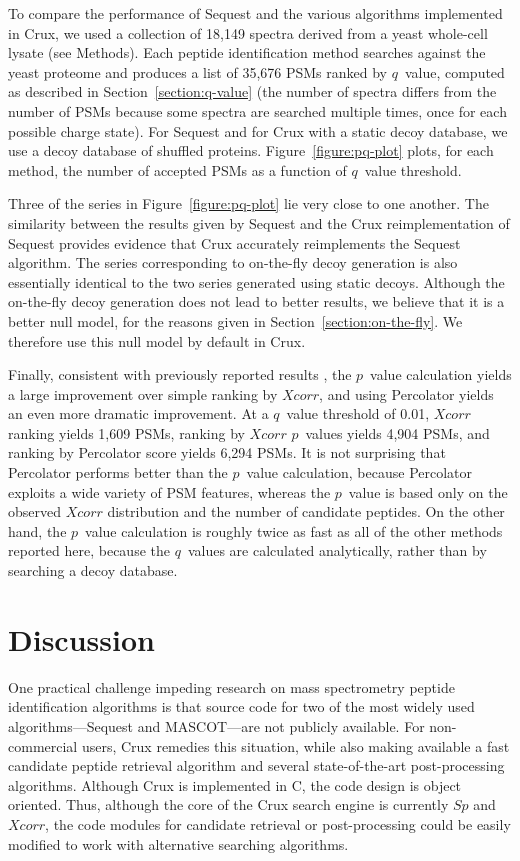\documentclass[12pt]{article}
\begin{document}
To compare the performance of {\sc Sequest} and the various algorithms
implemented in Crux, we used a collection of 18,149 spectra derived
from a yeast whole-cell lysate (see Methods).  Each peptide
identification method searches against the yeast proteome and produces
a list of 35,676 PSMs ranked by $q$~value, computed as described in
Section~\ref{section:q-value} (the number of spectra differs from the number
of PSMs because some spectra are searched multiple times, once for each
possible charge state).  For {\sc Sequest} and for Crux with a static
decoy database, we use a decoy database of shuffled proteins.
Figure~\ref{figure:pq-plot} plots, for each method, the number of
accepted PSMs as a function of $q$~value threshold.

Three of the series in Figure~\ref{figure:pq-plot} lie very close to
one another.  The similarity between the results given by {\sc
Sequest} and the Crux reimplementation of {\sc Sequest} provides
evidence that Crux accurately reimplements the {\sc Sequest}
algorithm.  The series corresponding to on-the-fly decoy generation is
also essentially identical to the two series generated using static
decoys.  Although the on-the-fly decoy generation does not lead to
better results, we believe that it is a better null model, for the
reasons given in Section~\ref{section:on-the-fly}.  We therefore use
this null model by default in Crux.

Finally, consistent with previously reported results
\cite{klammer:not, kall:semi-supervised}, the $p$~value calculation
yields a large improvement over simple ranking by $Xcorr$, and using
Percolator yields an even more dramatic improvement.  At a $q$~value
threshold of 0.01, $Xcorr$ ranking yields 1,609 PSMs, ranking by
$Xcorr$ $p$~values yields 4,904 PSMs, and ranking by Percolator score
yields 6,294 PSMs.  It is not surprising that Percolator performs
better than the $p$~value calculation, because Percolator exploits a
wide variety of PSM features, whereas the $p$~value is based only on
the observed $Xcorr$ distribution and the number of candidate
peptides.  On the other hand, the $p$~value calculation is roughly
twice as fast as all of the other methods reported here, because the
$q$~values are calculated analytically, rather than by searching a
decoy database.

\section{Discussion}

One practical challenge impeding research on mass spectrometry peptide
identification algorithms is that source code for two of the most
widely used algorithms---{\sc Sequest} and MASCOT---are not publicly
available.  For non-commercial users, Crux remedies this situation,
while also making available a fast candidate peptide retrieval
algorithm and several state-of-the-art post-processing algorithms.
Although Crux is implemented in C, the code design is object oriented.
Thus, although the core of the Crux search engine is currently $Sp$
and $Xcorr$, the code modules for candidate retrieval or
post-processing could be easily modified to work with alternative
searching algorithms.
\end{document}
